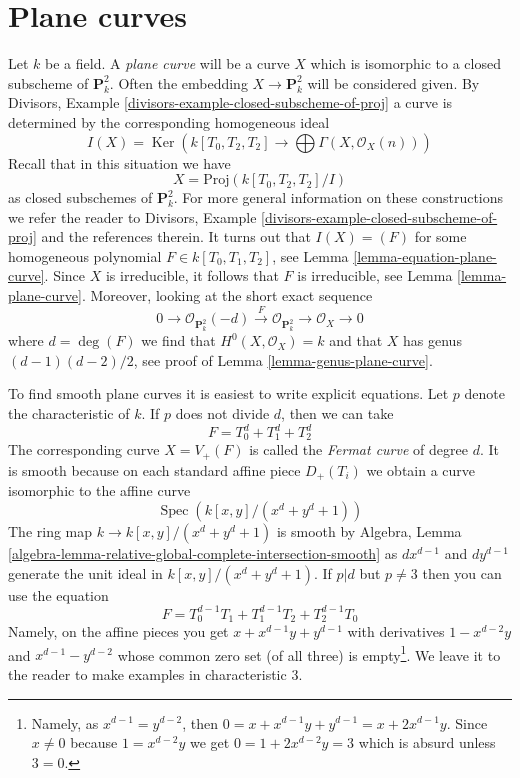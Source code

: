 \documentclass{stacks-project}
\theoremstyle{plain}
\theoremstyle{definition}
\theoremstyle{remark}
\numberwithin{equation}{subsection}
\def\Spec{\mathop{\mathrm{Spec}}}
\def\Ker{\mathop{\mathrm{Ker}}}
\begin{document}
\section{Plane curves}
\label{section-plane-curves}

\noindent
Let $k$ be a field. A {\it plane curve} will be a curve $X$ which is isomorphic
to a closed subscheme of $\mathbf{P}^2_k$. Often the embedding
$X \to \mathbf{P}^2_k$ will be considered given. By
Divisors, Example \ref{divisors-example-closed-subscheme-of-proj}
a curve is determined by the corresponding homogeneous ideal
$$
I(X) =
\Ker\left(
k[T_0, T_2, T_2] \longrightarrow \bigoplus \Gamma(X, \mathcal{O}_X(n))
\right)
$$
Recall that in this situation we have
$$
X = \text{Proj}(k[T_0, T_2, T_2]/I)
$$
as closed subschemes of $\mathbf{P}^2_k$.
For more general information on these constructions we refer the
reader to Divisors, Example \ref{divisors-example-closed-subscheme-of-proj}
and the references therein.
It turns out that $I(X) = (F)$ for some homogeneous polynomial
$F \in k[T_0, T_1, T_2]$, see Lemma \ref{lemma-equation-plane-curve}.
Since $X$ is irreducible, it follows that $F$ is irreducible, see
Lemma \ref{lemma-plane-curve}. Moreover, looking at the short exact
sequence
$$
0 \to \mathcal{O}_{\mathbf{P}^2_k}(-d) \xrightarrow{F}
\mathcal{O}_{\mathbf{P}^2_k} \to \mathcal{O}_X \to 0
$$
where $d = \deg(F)$ we find that $H^0(X, \mathcal{O}_X) = k$ and that $X$
has genus $(d - 1)(d - 2)/2$, see proof of Lemma \ref{lemma-genus-plane-curve}.

\medskip\noindent
To find smooth plane curves it is easiest to write explicit
equations. Let $p$ denote the characteristic of $k$. If $p$
does not divide $d$, then we can take
$$
F = T_0^d + T_1^d + T_2^d
$$
The corresponding curve $X = V_+(F)$ is called the
{\it Fermat curve} of degree $d$. It is smooth because
on each standard affine piece $D_+(T_i)$ we obtain
a curve isomorphic to the affine curve
$$
\Spec(k[x, y]/(x^d + y^d + 1))
$$
The ring map $k \to k[x, y]/(x^d + y^d + 1)$ is smooth by
Algebra, Lemma \ref{algebra-lemma-relative-global-complete-intersection-smooth}
as $d x^{d - 1}$ and $d y^{d - 1}$ generate the unit ideal
in $k[x, y]/(x^d + y^d + 1)$. If $p | d$ but $p \not = 3$
then you can use the equation
$$
F = T_0^{d - 1}T_1 + T_1^{d - 1}T_2 + T_2^{d - 1}T_0
$$
Namely, on the affine pieces you get $x + x^{d - 1}y + y^{d - 1}$
with derivatives $1 - x^{d - 2}y$ and $x^{d - 1} - y^{d - 2}$
whose common zero set (of all three) is empty\footnote{Namely,
as $x^{d - 1} = y^{d - 2}$, then $0 = x + x^{d - 1}y + y^{d - 1} =
x + 2 x^{d - 1} y$. Since $x \not = 0$ because $1 = x^{d - 2}y$
we get $0 = 1 + 2x^{d - 2}y = 3$ which is absurd unless $3 = 0$.}.
We leave it to the reader to make examples in characteristic $3$.
\end{document}
